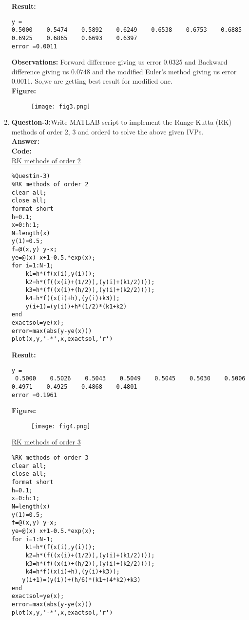 \documentclass{article}
\begin{document}
\begin{enumerate}
\begin{lstlisting}
\end{lstlisting}
\textbf{Result:}
\begin{lstlisting}
y =
0.5000    0.5474    0.5892    0.6249    0.6538    0.6753    0.6885    0.6925    0.6865    0.6693    0.6397
error =0.0011
\end{lstlisting}
\textbf{Observations:} Forward difference giving us error 0.0325 and Backward difference giving us 0.0748 and the modified Euler's method giving us error 0.0011. So,we are getting best result for modified one.\\
\textbf{Figure:}
\begin{figure}[H]                                 
	  \centering                          
	  \texttt{[image: fig3.png]}
\caption{}
\label{fig:1.1}                        
  \end{figure}
\item \textbf{Question-3:}Write MATLAB script to implement the Runge-Kutta (RK) methods of order 2, 3 and order4 to solve the above given IVPs.\\
\textbf{Answer:}\\
\textbf{Code:}\\
\underline{RK methods of order 2}
\begin{lstlisting}
%Questin-3)
%RK methods of order 2
clear all;
close all;
format short 
h=0.1;
x=0:h:1;
N=length(x)
y(1)=0.5;
f=@(x,y) y-x;
ye=@(x) x+1-0.5.*exp(x);
for i=1:N-1;
    k1=h*(f(x(i),y(i)));
    k2=h*(f((x(i)+(1/2)),(y(i)+(k1/2))));
    k3=h*(f((x(i)+(h/2)),(y(i)+(k2/2))));
    k4=h*f((x(i)+h),(y(i)+k3));
    y(i+1)=(y(i))+h*(1/2)*(k1+k2)
end
exactsol=ye(x);
error=max(abs(y-ye(x)))
plot(x,y,'-*',x,exactsol,'r')
\end{lstlisting}
\textbf{Result:}
\begin{lstlisting}
y =
 0.5000    0.5026    0.5043    0.5049    0.5045    0.5030    0.5006    0.4971    0.4925    0.4868    0.4801
error =0.1961
\end{lstlisting}
\textbf{Figure:}
\begin{figure}[H]                                 
	  \centering                          
	  \texttt{[image: fig4.png]}
\caption{}
\label{fig:1.1}                        
  \end{figure}
\underline{RK methods of order 3}
\begin{lstlisting}
%RK methods of order 3
clear all;
close all;
format short 
h=0.1;
x=0:h:1;
N=length(x)
y(1)=0.5;
f=@(x,y) y-x;
ye=@(x) x+1-0.5.*exp(x);
for i=1:N-1;
    k1=h*(f(x(i),y(i)));
    k2=h*(f((x(i)+(1/2)),(y(i)+(k1/2))));
    k3=h*(f((x(i)+(h/2)),(y(i)+(k2/2))));
    k4=h*f((x(i)+h),(y(i)+k3));
   y(i+1)=(y(i))+(h/6)*(k1+(4*k2)+k3)
end
exactsol=ye(x);
error=max(abs(y-ye(x)))
plot(x,y,'-*',x,exactsol,'r')


\end{lstlisting}
\end{enumerate}
\end{document}
